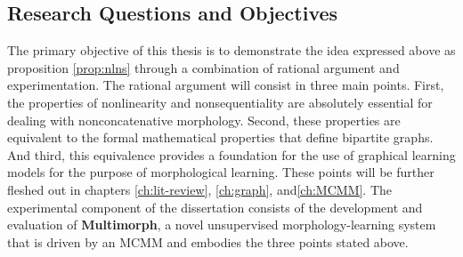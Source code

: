 \begin{definition}
\section{Research Questions and Objectives}
The primary objective of this thesis is to demonstrate the idea expressed above as proposition \ref{prop:nlns} through a combination of rational argument and experimentation.
The rational argument will consist in three main points.
First, the properties of nonlinearity and nonsequentiality are absolutely essential for dealing with nonconcatenative morphology.
Second, these properties are equivalent to the formal mathematical properties that define bipartite graphs. And third, this equivalence provides a foundation for the use of graphical learning models for the purpose of morphological learning. 
These points will be further fleshed out in chapters \ref{ch:lit-review}, \ref{ch:graph}, and\ref{ch:MCMM}. 
The experimental component of the dissertation consists of the development and evaluation of
 \textbf{Multimorph}, a novel unsupervised morphology-learning system that is driven by an MCMM and embodies the three points stated above.
	

\end{definition}
